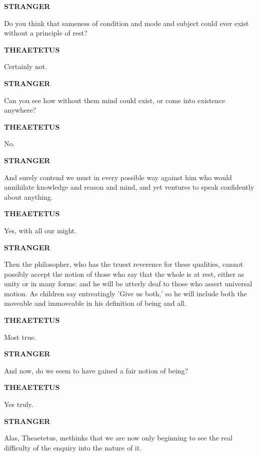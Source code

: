 \documentclass[11pt,letter]{article}
\begin{document}
\par \textbf{STRANGER}
\par   Do you think that sameness of condition and mode and subject could ever exist without a principle of rest?

\par \textbf{THEAETETUS}
\par   Certainly not.

\par \textbf{STRANGER}
\par   Can you see how without them mind could exist, or come into existence anywhere?

\par \textbf{THEAETETUS}
\par   No.

\par \textbf{STRANGER}
\par   And surely contend we must in every possible way against him who would annihilate knowledge and reason and mind, and yet ventures to speak confidently about anything.

\par \textbf{THEAETETUS}
\par   Yes, with all our might.

\par \textbf{STRANGER}
\par   Then the philosopher, who has the truest reverence for these qualities, cannot possibly accept the notion of those who say that the whole is at rest, either as unity or in many forms:  and he will be utterly deaf to those who assert universal motion. As children say entreatingly 'Give us both,' so he will include both the moveable and immoveable in his definition of being and all.

\par \textbf{THEAETETUS}
\par   Most true.

\par \textbf{STRANGER}
\par   And now, do we seem to have gained a fair notion of being?

\par \textbf{THEAETETUS}
\par   Yes truly.

\par \textbf{STRANGER}
\par   Alas, Theaetetus, methinks that we are now only beginning to see the real difficulty of the enquiry into the nature of it.
\end{document}
